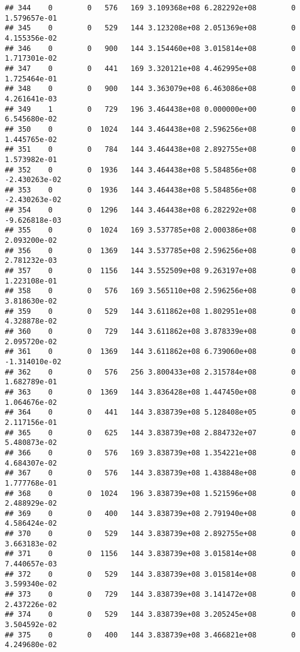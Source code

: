 \documentclass[
]{article}
\begin{document}
\begin{enumerate}
\begin{verbatim}
## 344    0        0   576   169 3.109368e+08 6.282292e+08        0  1.579657e-01
## 345    0        0   529   144 3.123208e+08 2.051369e+08        0  4.155356e-02
## 346    0        0   900   144 3.154460e+08 3.015814e+08        0  1.717301e-02
## 347    0        0   441   169 3.320121e+08 4.462995e+08        0  1.725464e-01
## 348    0        0   900   144 3.363079e+08 6.463086e+08        0  4.261641e-03
## 349    1        0   729   196 3.464438e+08 0.000000e+00        0  6.545680e-02
## 350    0        0  1024   144 3.464438e+08 2.596256e+08        0  1.445765e-02
## 351    0        0   784   144 3.464438e+08 2.892755e+08        0  1.573982e-01
## 352    0        0  1936   144 3.464438e+08 5.584856e+08        0 -2.430263e-02
## 353    0        0  1936   144 3.464438e+08 5.584856e+08        0 -2.430263e-02
## 354    0        0  1296   144 3.464438e+08 6.282292e+08        0 -9.626818e-03
## 355    0        0  1024   169 3.537785e+08 2.000386e+08        0  2.093200e-02
## 356    0        0  1369   144 3.537785e+08 2.596256e+08        0  2.781232e-03
## 357    0        0  1156   144 3.552509e+08 9.263197e+08        0  1.223108e-01
## 358    0        0   576   169 3.565110e+08 2.596256e+08        0  3.818630e-02
## 359    0        0   529   144 3.611862e+08 1.802951e+08        0  4.328878e-02
## 360    0        0   729   144 3.611862e+08 3.878339e+08        0  2.095720e-02
## 361    0        0  1369   144 3.611862e+08 6.739060e+08        0 -1.314010e-02
## 362    0        0   576   256 3.800433e+08 2.315784e+08        0  1.682789e-01
## 363    0        0  1369   144 3.836428e+08 1.447450e+08        0  1.064676e-02
## 364    0        0   441   144 3.838739e+08 5.128408e+05        0  2.117156e-01
## 365    0        0   625   144 3.838739e+08 2.884732e+07        0  5.480873e-02
## 366    0        0   576   169 3.838739e+08 1.354221e+08        0  4.684307e-02
## 367    0        0   576   144 3.838739e+08 1.438848e+08        0  1.777768e-01
## 368    0        0  1024   196 3.838739e+08 1.521596e+08        0  2.488929e-02
## 369    0        0   400   144 3.838739e+08 2.791940e+08        0  4.586424e-02
## 370    0        0   529   144 3.838739e+08 2.892755e+08        0  3.663183e-02
## 371    0        0  1156   144 3.838739e+08 3.015814e+08        0  7.440657e-03
## 372    0        0   529   144 3.838739e+08 3.015814e+08        0  3.599340e-02
## 373    0        0   729   144 3.838739e+08 3.141472e+08        0  2.437226e-02
## 374    0        0   529   144 3.838739e+08 3.205245e+08        0  3.504592e-02
## 375    0        0   400   144 3.838739e+08 3.466821e+08        0  4.249680e-02

\end{verbatim}
\end{enumerate}
\end{document}
